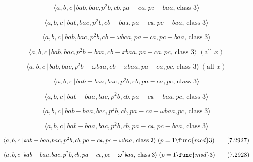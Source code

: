 \documentclass[10pt]{article}
\begin{document}
\begin{equation}
\langle a,b,c\,|\,bab,bac,p^2b,cb,pa-ca,pc-baa,\,\text{class }3\rangle 
\tag{7.2918}
\end{equation}

\begin{equation}
\langle a,b,c\,|\,bab,bac,p^2b,cb-baa,pa-ca,pc-baa,\,\text{class }3\rangle 
\tag{7.2919}
\end{equation}

\begin{equation}
\langle a,b,c\,|\,bab,bac,p^{2}b,cb-\omega baa,pa-ca,pc-baa,\,\text{class }%
3\rangle  \tag{7.2920}
\end{equation}

\begin{equation}
\langle a,b,c\,|\,bab,bac,p^2b-baa,cb-xbaa,pa-ca,pc,\,\text{class }3\rangle
\;(\text{all }x)  \tag{7.2921}
\end{equation}

\begin{equation}
\langle a,b,c\,|\,bab,bac,p^{2}b-\omega baa,cb-xbaa,pa-ca,pc,\,\text{class }%
3\rangle \;(\text{all }x)  \tag{7.2922}
\end{equation}

\begin{equation}
\langle a,b,c\,|\,bab-baa,bac,p^2b,cb,pa-ca,pc,\,\text{class }3\rangle 
\tag{7.2923}
\end{equation}

\begin{equation}
\langle a,b,c\,|\,bab-baa,bac,p^2b,cb,pa-ca-baa,pc,\,\text{class }3\rangle 
\tag{7.2924}
\end{equation}

\begin{equation}
\langle a,b,c\,|\,bab-baa,bac,p^{2}b,cb,pa-ca-\omega baa,pc,\,\text{class }%
3\rangle  \tag{7.2925}
\end{equation}

\begin{equation}
\langle a,b,c\,|\,bab-baa,bac,p^2b,cb,pa-ca,pc-baa,\,\text{class }3\rangle 
\tag{7.2926}
\end{equation}

\begin{equation}
\langle a,b,c\,|\,bab-baa,bac,p^{2}b,cb,pa-ca,pc-\omega baa,\,\text{class }%
3\rangle \;(p=1\func{mod}3)  \tag{7.2927}
\end{equation}

\begin{equation}
\langle a,b,c\,|\,bab-baa,bac,p^{2}b,cb,pa-ca,pc-\omega ^{2}baa,\,\text{%
class }3\rangle \;(p=1\func{mod}3)  \tag{7.2928}
\end{equation}
\end{document}
